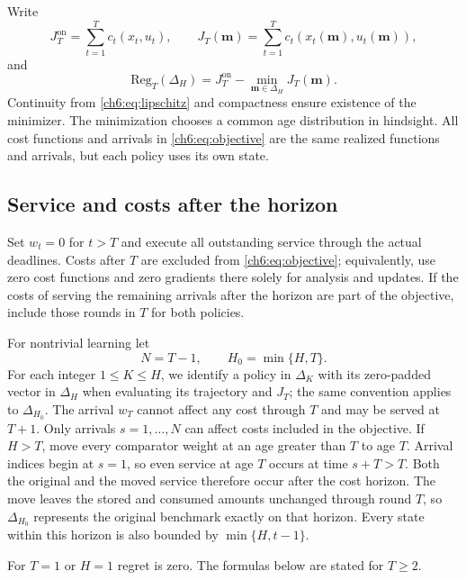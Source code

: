 \documentclass[11pt]{article}
\newcommand{\Reg}{\mathrm{Reg}}
\theoremstyle{plain}
\theoremstyle{remark}
\numberwithin{equation}{section}
\begin{document}
Write
\begin{equation}\label{ch6:eq:objective}
 J_T^{\mathrm{on}}=\sum_{t=1}^Tc_t(x_t,u_t),\qquad
 J_T(\mathbf m)=\sum_{t=1}^Tc_t(x_t(\mathbf m),u_t(\mathbf m)),
\end{equation}
and
\begin{equation}\label{ch6:eq:regret}
 \Reg_T(\Delta_H)=J_T^{\mathrm{on}}-\min_{\mathbf m\in\Delta_H}J_T(\mathbf m).
\end{equation}
Continuity from \eqref{ch6:eq:lipschitz} and compactness ensure existence of the
minimizer. The minimization chooses a common age distribution in hindsight.
All cost functions and arrivals
in \eqref{ch6:eq:objective} are the same realized functions and arrivals,
but each policy uses its own state.

\subsection{Service and costs after the horizon}\label{ch6:subsec:terminal}
Set $w_t=0$ for $t>T$ and execute all outstanding service through the actual
deadlines. Costs after $T$ are excluded from \eqref{ch6:eq:objective}; equivalently,
use zero cost functions and zero gradients there solely for analysis and
updates. If the costs of serving the remaining arrivals after the horizon are
part of the objective, include those rounds in $T$ for both policies.

For nontrivial learning let
\begin{equation}\label{ch6:eq:horizons}
 N=T-1,\qquad H_0=\min\{H,T\}.
\end{equation}
For each integer $1\le K\le H$, we identify a policy in $\Delta_K$ with its zero-padded
vector in $\Delta_H$ when evaluating its trajectory and $J_T$; the same
convention applies to $\Delta_{H_0}$.
The arrival $w_T$ cannot affect any cost through $T$ and may be served at
$T+1$. Only arrivals $s=1,\ldots,N$ can affect costs included in the objective. If $H>T$, move every
comparator weight at an age greater than $T$ to age $T$. Arrival indices
begin at $s=1$, so even service at age $T$ occurs at time $s+T>T$. Both the
original and the moved service therefore occur after the cost horizon.
The move leaves the stored and consumed amounts unchanged through round $T$,
so $\Delta_{H_0}$ represents the original benchmark exactly on that horizon.
Every state within this horizon is also bounded by $\min\{H,t-1\}$.

For $T=1$ or $H=1$ regret is zero. The formulas below are stated for
$T\ge2$.
\end{document}
